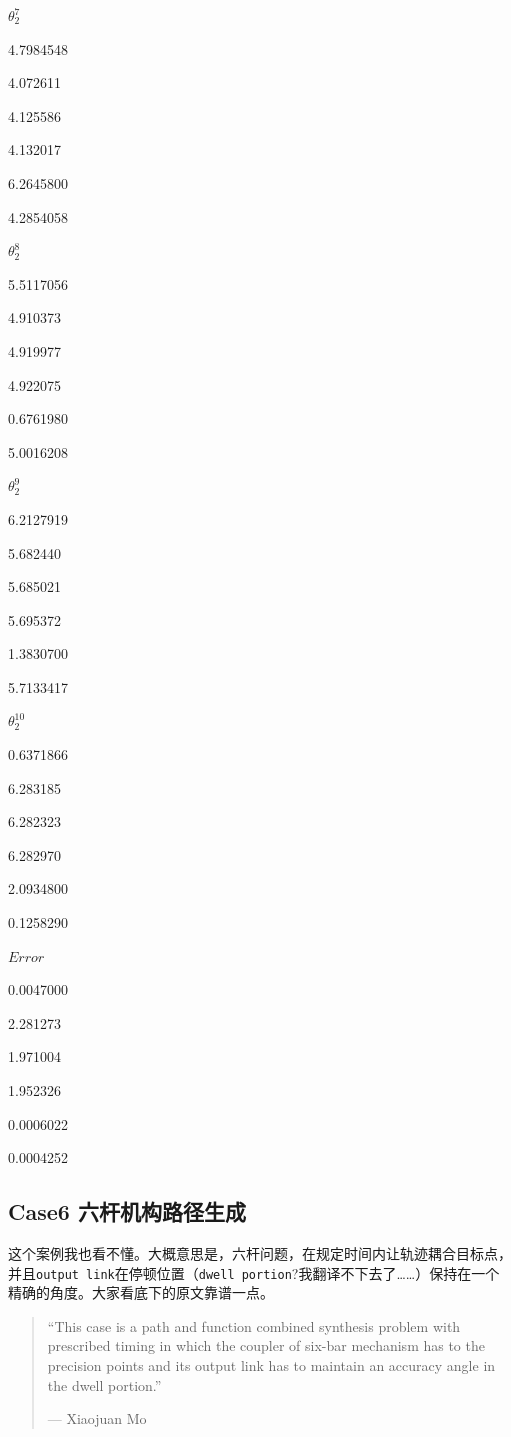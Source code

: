 \documentclass[]{ctexbook}
\theoremstyle{definition}
\theoremstyle{definition}
\theoremstyle{definition}
\theoremstyle{remark}
\begin{document}
\(θ_2^7\)

4.7984548

4.072611

4.125586

4.132017

6.2645800

4.2854058

\(θ_2^8\)

5.5117056

4.910373

4.919977

4.922075

0.6761980

5.0016208

\(θ_2^9\)

6.2127919

5.682440

5.685021

5.695372

1.3830700

5.7133417

\(θ_2^{10}\)

0.6371866

6.283185

6.282323

6.282970

2.0934800

0.1258290

\(Error\)

0.0047000

2.281273

1.971004

1.952326

0.0006022

0.0004252

\subsection{Case6 六杆机构路径生成}\label{case6-}

这个案例我也看不懂。大概意思是，六杆问题，在规定时间内让轨迹耦合目标点，并且\texttt{output\ link}在停顿位置（\texttt{dwell\ portion}?我翻译不下去了\ldots{}\ldots{}）保持在一个精确的角度。大家看底下的原文靠谱一点。

\begin{quote}
``This case is a path and function combined synthesis problem with
prescribed timing in which the coupler of six-bar mechanism has to the
precision points and its output link has to maintain an accuracy angle
in the dwell portion.''

\begin{flushright}--- Xiaojuan Mo\end{flushright}
\end{quote}
\end{document}
